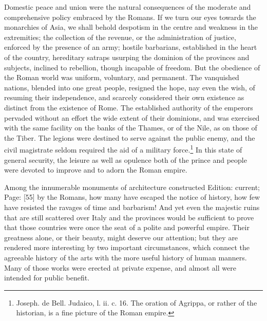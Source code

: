 Domestic peace and union were the natural consequences of the moderate and comprehensive policy embraced by the Romans. If we turn our eyes towards the monarchies of Asia, we shall behold despotism in the centre and weakness in the extremities; the collection of the revenue, or the administration of justice, enforced by the presence of an army; hostile barbarians, established in the heart of the country, hereditary satraps usurping the dominion of the provinces and subjects, inclined to rebellion, though incapable of freedom. But the obedience of the Roman world was uniform, voluntary, and permanent. The vanquished nations, blended into one great people, resigned the hope, nay even the wish, of resuming their independence, and scarcely considered their own existence as distinct from the existence of Rome. The established authority of the emperors pervaded without an effort the wide extent of their dominions, and was exercised with the same facility on the banks of the Thames, or of the Nile, as on those of the Tiber. The legions were destined to serve against the public enemy, and the civil magistrate seldom required the aid of a military force.\footnote{Joseph. de Bell. Judaico, l. ii. c. 16. The oration of Agrippa, or rather of the historian, is a fine picture of the Roman empire.} In this state of general security, the leisure as well as opulence both of the prince and people were devoted to improve and to adorn the Roman empire.

Among the innumerable monuments of architecture constructed Edition: current; Page: [55] by the Romans, how many have escaped the notice of history, how few have resisted the ravages of time and barbarism! And yet even the majestic ruins that are still scattered over Italy and the provinces would be sufficient to prove that those countries were once the seat of a polite and powerful empire. Their greatness alone, or their beauty, might deserve our attention; but they are rendered more interesting by two important circumstances, which connect the agreeable history of the arts with the more useful history of human manners. Many of those works were erected at private expense, and almost all were intended for public benefit.

